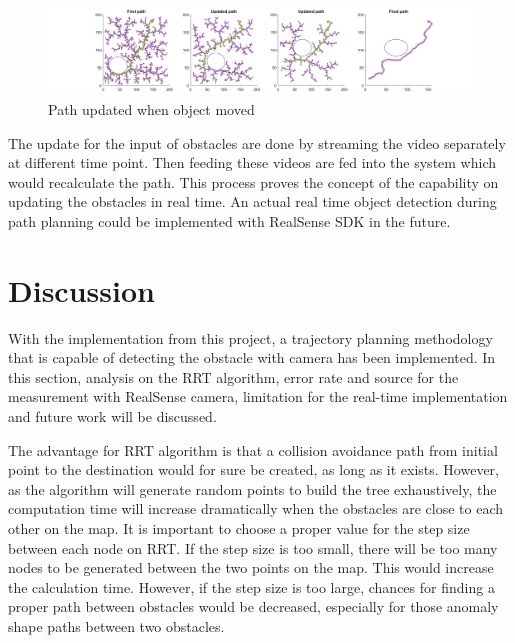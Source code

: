 \documentclass[
  oneside]{ubcthesis}
\begin{document}
\begin{figure}

{\centering \includegraphics[width=0.9\linewidth]{figures/11} 

}

\caption{Path updated when object moved}\label{fig:figure11}
\end{figure}



The update for the input of obstacles are done by streaming the video separately at different time point. Then feeding these videos are fed into the system which would recalculate the path. This process proves the concept of the capability on updating the obstacles in real time. An actual real time object detection during path planning could be implemented with RealSense SDK in the future.

\hypertarget{discussion}{%
\chapter{Discussion}\label{discussion}}

With the implementation from this project, a trajectory planning methodology that is capable of detecting the obstacle with camera has been implemented. In this section, analysis on the RRT algorithm, error rate and source for the measurement with RealSense camera, limitation for the real-time implementation and future work will be discussed.

The advantage for RRT algorithm is that a collision avoidance path from initial point to the destination would for sure be created, as long as it exists. However, as the algorithm will generate random points to build the tree exhaustively, the computation time will increase dramatically when the obstacles are close to each other on the map. It is important to choose a proper value for the step size between each node on RRT. If the step size is too small, there will be too many nodes to be generated between the two points on the map. This would increase the calculation time. However, if the step size is too large, chances for finding a proper path between obstacles would be decreased, especially for those anomaly shape paths between two obstacles.
\end{document}
